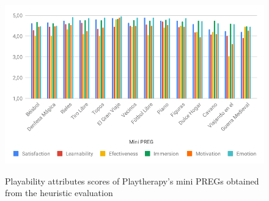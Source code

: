 
\begin{figure}[bth]
\myfloatalign
{\includegraphics[width=\linewidth]{gfx/playtherapy/playability_attributtes}} \quad
\caption{Playability attributes scores of Playtherapy's mini \acp{PREG} obtained from the heuristic evaluation}
\label{fig:playability_attributtes}
\end{figure}

